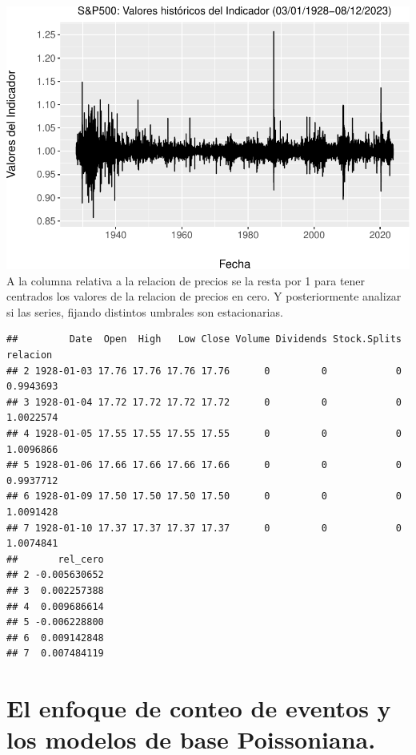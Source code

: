 \documentclass[
  oneside]{article}
\newenvironment{Shaded}{\begin{snugshade}}{\end{snugshade}}
\newcommand{\DecValTok}[1]{\textcolor[rgb]{0.00,0.00,0.81}{#1}}
\newcommand{\FunctionTok}[1]{\textcolor[rgb]{0.13,0.29,0.53}{\textbf{#1}}}
\newcommand{\NormalTok}[1]{#1}
\newcommand{\OtherTok}[1]{\textcolor[rgb]{0.56,0.35,0.01}{#1}}
\newcommand{\SpecialCharTok}[1]{\textcolor[rgb]{0.81,0.36,0.00}{\textbf{#1}}}
\begin{document}
\includegraphics{Entrega_Laura_Montaldo_files/figure-latex/unnamed-chunk-13-1.pdf}
A la columna relativa a la relacion de precios se la resta por 1 para
tener centrados los valores de la relacion de precios en cero. Y
posteriormente analizar si las series, fijando distintos umbrales son
estacionarias.

\begin{Shaded}
\end{Shaded}

\begin{verbatim}
##         Date  Open  High   Low Close Volume Dividends Stock.Splits  relacion
## 2 1928-01-03 17.76 17.76 17.76 17.76      0         0            0 0.9943693
## 3 1928-01-04 17.72 17.72 17.72 17.72      0         0            0 1.0022574
## 4 1928-01-05 17.55 17.55 17.55 17.55      0         0            0 1.0096866
## 5 1928-01-06 17.66 17.66 17.66 17.66      0         0            0 0.9937712
## 6 1928-01-09 17.50 17.50 17.50 17.50      0         0            0 1.0091428
## 7 1928-01-10 17.37 17.37 17.37 17.37      0         0            0 1.0074841
##       rel_cero
## 2 -0.005630652
## 3  0.002257388
## 4  0.009686614
## 5 -0.006228800
## 6  0.009142848
## 7  0.007484119
\end{verbatim}

\section{El enfoque de conteo de eventos y los modelos de base Poissoniana.}
\end{document}
